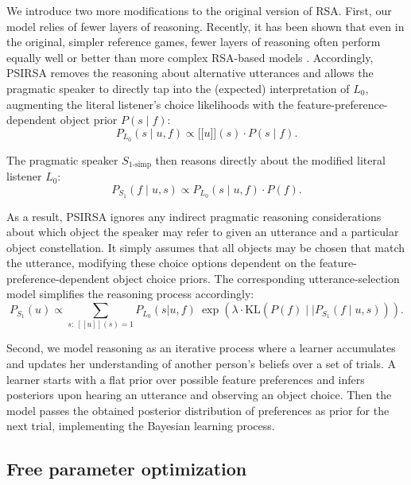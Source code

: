 \documentclass[10pt,a4paper]{article}
\newcommand{\sem}[1]{\mbox{$[\![$#1$]\!]$}}
\begin{document}
We introduce two more modifications to the original version of RSA. First, our model relies of fewer layers of reasoning. Recently, it has been shown that even in the original, simpler reference games, fewer layers of reasoning often perform equally well or better than more complex RSA-based models \cite{sikos2019}.
Accordingly, PSIRSA removes the reasoning about alternative utterances and allows the pragmatic speaker to directly tap into the (expected) interpretation of $L_0$, augmenting the literal listener's choice likelihoods with the feature-preference-dependent object prior $P(s\mid f)$:
\begin{equation}
P_{L_{0}}(s\mid u,f) \propto \sem{$u$}(s) \cdot P(s\mid f).
\end{equation}

The pragmatic speaker $S_{1\textrm{-simp}}$ then reasons directly about the modified literal listener $L_{0}$: 
\begin{equation}
P_{S_{1}}(f\mid u,s) \propto P_{L_{0}}(s\mid u,f) \cdot P(f).
\end{equation}

As a result, PSIRSA ignores any indirect pragmatic reasoning considerations about which object the speaker may refer to given an utterance and a particular object constellation.
It simply assumes that all objects may be chosen that match the utterance, modifying these choice options dependent on the feature-preference-dependent object choice priors. The corresponding utterance-selection model simplifies the reasoning process accordingly:
\begin{equation}
P_{S_1}(u) \propto \sum_{s:\  [\![u]\!](s)=1} P_{L_0}(s|u,f)\ \exp(\lambda \cdot \textrm{KL}(P(f)\mid\mid P_{S_{1}}(f\mid u,s))).
\label{eq:kldivlambdasimp}
\end{equation}

Second, we model reasoning as an iterative process where a learner accumulates and updates her understanding of another person's beliefs over a set of trials. A learner starts with a flat prior over possible feature preferences and infers posteriors upon hearing an utterance and observing an object choice. Then the model passes the obtained posterior distribution of preferences as prior for the next trial, implementing the Bayesian learning process.

\subsection{Free parameter optimization}
\end{document}
